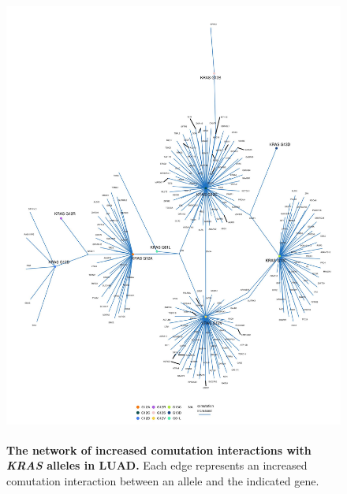 \documentclass[english, 12pt, letterpaper]{article}
\newcommand{\KRAS}{\emph{KRAS}}
\begin{document}
\begin{figure}[p]
\centering
\includegraphics[height=150mm]{figures/SuppFigure_06.jpeg}
\caption{
    \textbf{The network of increased comutation interactions with \KRAS{} alleles in LUAD.} Each edge represents an increased comutation interaction between an allele and the indicated gene.
}
\label{sfig:luad_labeled-increased-comutation}
\end{figure}
\end{document}
